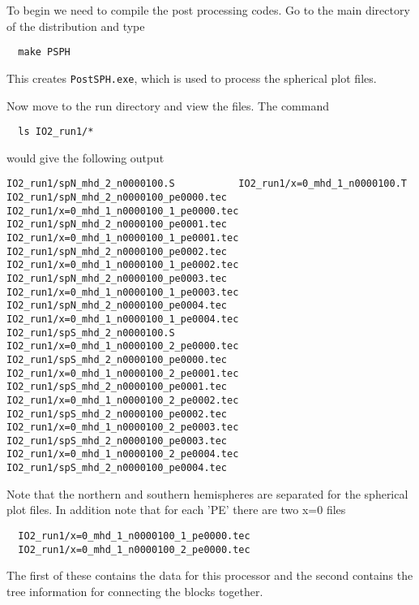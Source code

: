 To begin we need to compile the post processing codes.  Go to the main
directory of the distribution and type
\begin{verbatim}
  make PSPH
\end{verbatim}
This creates {\tt PostSPH.exe}, which is used
to process the spherical plot files.

Now move to the run directory and view the files.  The command
\begin{verbatim}
  ls IO2_run1/* 
\end{verbatim}
would give the following output
\begin{verbatim}
IO2_run1/spN_mhd_2_n0000100.S           IO2_run1/x=0_mhd_1_n0000100.T
IO2_run1/spN_mhd_2_n0000100_pe0000.tec  IO2_run1/x=0_mhd_1_n0000100_1_pe0000.tec
IO2_run1/spN_mhd_2_n0000100_pe0001.tec  IO2_run1/x=0_mhd_1_n0000100_1_pe0001.tec
IO2_run1/spN_mhd_2_n0000100_pe0002.tec  IO2_run1/x=0_mhd_1_n0000100_1_pe0002.tec
IO2_run1/spN_mhd_2_n0000100_pe0003.tec  IO2_run1/x=0_mhd_1_n0000100_1_pe0003.tec
IO2_run1/spN_mhd_2_n0000100_pe0004.tec  IO2_run1/x=0_mhd_1_n0000100_1_pe0004.tec
IO2_run1/spS_mhd_2_n0000100.S           IO2_run1/x=0_mhd_1_n0000100_2_pe0000.tec
IO2_run1/spS_mhd_2_n0000100_pe0000.tec  IO2_run1/x=0_mhd_1_n0000100_2_pe0001.tec
IO2_run1/spS_mhd_2_n0000100_pe0001.tec  IO2_run1/x=0_mhd_1_n0000100_2_pe0002.tec
IO2_run1/spS_mhd_2_n0000100_pe0002.tec  IO2_run1/x=0_mhd_1_n0000100_2_pe0003.tec
IO2_run1/spS_mhd_2_n0000100_pe0003.tec  IO2_run1/x=0_mhd_1_n0000100_2_pe0004.tec
IO2_run1/spS_mhd_2_n0000100_pe0004.tec  
\end{verbatim}
Note that the northern and southern hemispheres are separated for 
the spherical plot files.  In addition note that for each 'PE' there
are two x=0 files
\begin{verbatim}
  IO2_run1/x=0_mhd_1_n0000100_1_pe0000.tec
  IO2_run1/x=0_mhd_1_n0000100_2_pe0000.tec
\end{verbatim}
The first of these contains the data for this processor and the second
contains the tree information for connecting the blocks together.

